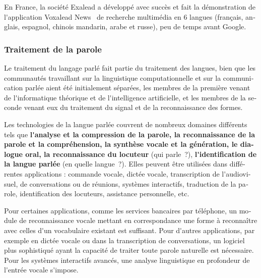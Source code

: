\documentclass[]{../metanetpaper}
\begin{document}
\begin{french}
\begin{multicols}{2}
En France, la société Exalead a développé avec succès et fait la démonstration de 
l{\mbox '}application Voxalead News~\cite{voxaleadnews} de recherche multimédia en 6 langues
(français, anglais, espagnol, chinois mandarin, arabe et russe),
peu de temps avant Google.

\subsubsection{Traitement de la parole}
Le traitement du langage parlé fait partie du traitement des langues,
bien que les communautés travaillant sur la linguistique
computationnelle et sur la communication parlée aient été initialement
séparées, les membres de la première venant de l{\mbox '}informatique
théorique et de l{\mbox '}intelligence artificielle, et les membres de
la seconde venant eux du traitement du signal et de la reconnaissance
des formes.

Les technologies de la langue parlée couvrent de nombreux domaines
différents tels que {\bf l{\mbox '}analyse et la compression de la
  parole, la reconnaissance de la parole et la compréhension, la
  synthèse vocale et la génération, le dialogue oral, la
  reconnaissance du locuteur} (qui parle~?), {\bf l{\mbox
    '}identification de la langue parlée} (en quelle langue~?). Elles
peuvent être utilisées dans différentes applications : commande
vocale, dictée vocale, transcription de l{\mbox '}audiovisuel, de
conversations ou de réunions, systèmes interactifs, traduction de la
parole, identification des locuteurs, assistance personnelle, etc.

Pour certaines applications, comme les services bancaires par
téléphone, un module de reconnaissance vocale mettant en
correspondance une forme à reconnaître avec celles d{\mbox '}un vocabulaire
existant est suffisant. Pour d{\mbox '}autres applications, par exemple en
dictée vocale ou dans la transcription de conversations, un logiciel
plus sophistiqué ayant la capacité de traiter toute parole naturelle
est nécessaire. Pour les systèmes interactifs avancés, une analyse
linguistique en profondeur de l{\mbox '}entrée vocale s{\mbox '}impose.


\end{multicols}
\end{french}
\end{document}
